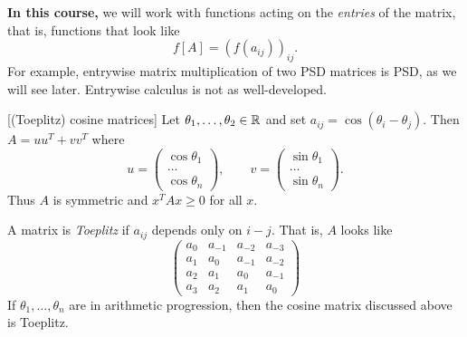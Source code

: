 \textbf{In this course,} we will work with functions acting on the
\emph{entries} of the matrix, that is, functions that look like \[
    f[A] = (f(a_{ij}))_{ij}.
\] For example, entrywise matrix multiplication of two PSD matrices is PSD,
as we will see later.
Entrywise calculus is not as well-developed.

\begin{examples}
    \item{} [(Toeplitz) cosine matrices]
    Let $\theta_1, \dots, \theta_2 \in \mathbb{R}$ and set
    $a_{ij} = \cos(\theta_i - \theta_j)$.
    Then $A = u u^T + v v^T$ where \[
        u = \begin{pmatrix}
            \cos \theta_1 \\
            \dots \\
            \cos \theta_n
        \end{pmatrix}, \qquad
        v = \begin{pmatrix}
            \sin \theta_1 \\
            \dots \\
            \sin \theta_n
        \end{pmatrix}.
    \] Thus $A$ is symmetric and $x^T A x \ge 0$ for all $x$.

    A matrix is \emph{Toeplitz} if $a_{ij}$ depends only on $i - j$.
    That is, $A$ looks like \[
        \begin{pmatrix}
            a_0 & a_{-1} & a_{-2} & a_{-3} \\
            a_1 & a_0 & a_{-1} & a_{-2} \\
            a_2 & a_1 & a_0 & a_{-1} \\
            a_3 & a_2 & a_1 & a_0
        \end{pmatrix}
    \] If $\theta_1, \dots, \theta_n$ are in arithmetic progression, then
    the cosine matrix discussed above is Toeplitz.


\end{examples}
